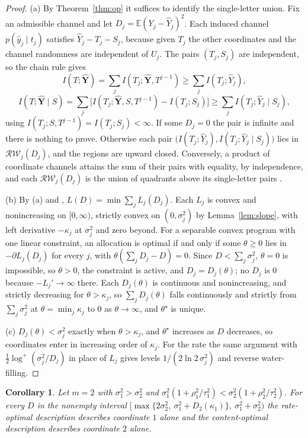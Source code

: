 \documentclass[11pt,onecolumn]{IEEEtran}
\newtheorem{corollary}[theorem]{Corollary}
\newcommand{\E}{\mathbb{E}}
\newcommand{\hY}{\widehat{Y}}
\newcommand{\hYv}{\hat{\mathbf Y}}
\newcommand{\RW}{\mathcal{R}\!\mathcal{W}}
\begin{document}
\begin{proof}
(a) By Theorem~\ref{thm:op} it suffices to identify the single-letter
union. Fix an admissible channel and let $D_j=\E(Y_j-\hY_j)^2$. Each
induced channel $p(\hat y_j\mid t_j)$ satisfies $\hY_j-T_j-S_j$, because
given $T_j$ the other coordinates and the channel randomness are
independent of $U_j$. The pairs $(T_j,S_j)$ are independent, so the chain
rule gives
\[
I(T;\hYv)=\sum_jI(T_j;\hYv,T^{j-1})\ge\sum_jI(T_j;\hY_j),
\]
\[
I(T;\hYv\mid S)=\sum_j\bigl[I(T_j;\hYv,S,T^{j-1})-I(T_j;S_j)\bigr]
\ge\sum_jI(T_j;\hY_j\mid S_j),
\]
using $I(T_j;S,T^{j-1})=I(T_j;S_j)<\infty$. If some $D_j=0$ the pair is
infinite and there is nothing to prove. Otherwise each pair
$\bigl(I(T_j;\hY_j),I(T_j;\hY_j\mid S_j)\bigr)$ lies in $\RW_j(D_j)$, and
the regions are upward closed. Conversely, a product of coordinate
channels attains the sum of their pairs with equality, by independence,
and each $\RW_j(D_j)$ is the union of quadrants above its single-letter
pairs \cite[Theorem~14(b)]{bond2026tit}.

(b) By (a) and \cite[Theorem~14(a)]{bond2026tit},
$L(D)=\min\sum_jL_j(D_j)$. Each $L_j$ is convex and nonincreasing on
$[0,\infty)$, strictly convex on $(0,\sigma_j^2)$ by Lemma~\ref{lem:slope},
with left derivative $-\kappa_j$ at $\sigma_j^2$ and zero beyond. For a
separable convex program with one linear constraint, an allocation is
optimal if and only if some $\theta\ge0$ lies in $-\partial L_j(D_j)$ for
every $j$, with $\theta(\sum_jD_j-D)=0$. Since $D<\sum_j\sigma_j^2$, $\theta=0$ is impossible, so
$\theta>0$, the constraint is active, and $D_j=D_j(\theta)$; no $D_j$ is
$0$ because $-L_j'\to\infty$ there. Each $D_j(\theta)$ is continuous and
nonincreasing, and strictly decreasing for $\theta>\kappa_j$, so
$\sum_jD_j(\theta)$ falls continuously and strictly from $\sum_j\sigma_j^2$
at $\theta=\min_j\kappa_j$ to $0$ as $\theta\to\infty$, and $\theta^\star$
is unique.

(c) $D_j(\theta)<\sigma_j^2$ exactly when $\theta>\kappa_j$, and
$\theta^\star$ increases as $D$ decreases, so coordinates enter in
increasing order of $\kappa_j$. For the rate the same argument with
$\tfrac12\log^{+}(\sigma_j^2/D_j)$ in place of $L_j$ gives levels
$1/(2\ln2\,\sigma_j^2)$ and reverse water-filling.
\end{proof}

\begin{corollary}\label{cor:parallelmisalign}
Let $m=2$ with $\sigma_1^2>\sigma_2^2$ and
$\sigma_1^2(1+\rho_1^2/\tau_1^2)<\sigma_2^2(1+\rho_2^2/\tau_2^2)$. For
every $D$ in the nonempty interval
$\bigl[\max\{2\sigma_2^2,\ \sigma_1^2+D_2(\kappa_1)\},\ \sigma_1^2+\sigma_2^2\bigr)$
the rate-optimal description describes coordinate $1$ alone and the
content-optimal description describes coordinate $2$ alone.
\end{corollary}
\end{document}
